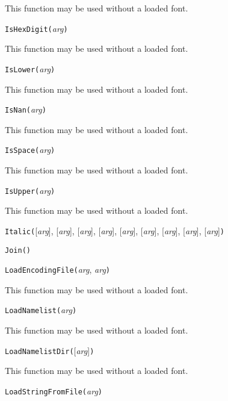 This function may be used without a loaded font.


\noindent\texttt{IsHexDigit(}\textit{arg}\texttt{)}

This function may be used without a loaded font.


\noindent\texttt{IsLower(}\textit{arg}\texttt{)}

This function may be used without a loaded font.


\noindent\texttt{IsNan(}\textit{arg}\texttt{)}

This function may be used without a loaded font.


\noindent\texttt{IsSpace(}\textit{arg}\texttt{)}

This function may be used without a loaded font.


\noindent\texttt{IsUpper(}\textit{arg}\texttt{)}

This function may be used without a loaded font.


\noindent\texttt{Italic(}[\textit{arg}], [\textit{arg}], [\textit{arg}], [\textit{arg}], [\textit{arg}], [\textit{arg}], [\textit{arg}], [\textit{arg}], [\textit{arg}]\texttt{)}


\noindent\texttt{Join(}\texttt{)}


\noindent\texttt{LoadEncodingFile(}\textit{arg}, \textit{arg}\texttt{)}

This function may be used without a loaded font.


\noindent\texttt{LoadNamelist(}\textit{arg}\texttt{)}

This function may be used without a loaded font.


\noindent\texttt{LoadNamelistDir(}[\textit{arg}]\texttt{)}

This function may be used without a loaded font.


\noindent\texttt{LoadStringFromFile(}\textit{arg}\texttt{)}

